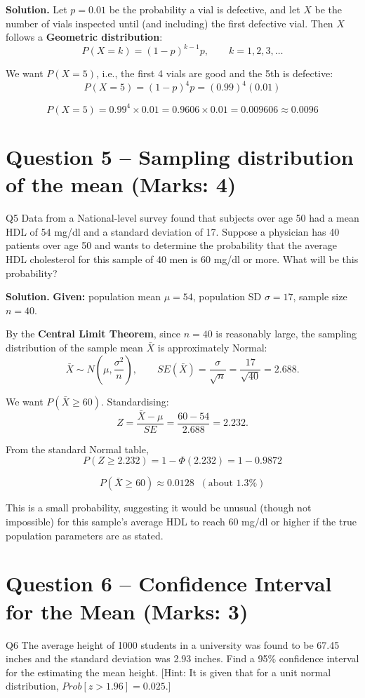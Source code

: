 \documentclass[11pt]{article}
\newcommand{\soln}{\par\noindent\textcolor{acolor}{\textbf{Solution.}}\quad}
\begin{document}
\soln
Let $p = 0.01$ be the probability a vial is defective, and let $X$ be the number of vials inspected until (and including) the first defective vial. Then $X$ follows a \textbf{Geometric distribution}:
\[
P(X=k) = (1-p)^{k-1}p, \qquad k=1,2,3,\dots
\]

We want $P(X=5)$, i.e., the first 4 vials are good and the 5th is defective:
\[
P(X=5) = (1-p)^4 p = (0.99)^4(0.01)
\]

\[
\boxed{P(X=5) = 0.99^4 \times 0.01 = 0.9606 \times 0.01 = 0.009606 \approx 0.0096}
\]

\section{Question 5 -- Sampling distribution of the mean (Marks: 4)}
\begin{question}{Q5}
Data from a National-level survey found that subjects over age 50 had a mean HDL of 54 mg/dl and a standard deviation of 17. Suppose a physician has 40 patients over age 50 and wants to determine the probability that the average HDL cholesterol for this sample of 40 men is 60 mg/dl or more. What will be this probability?
\end{question}

\soln
\textbf{Given:} population mean $\mu = 54$, population SD $\sigma = 17$, sample size $n=40$.

By the \textbf{Central Limit Theorem}, since $n=40$ is reasonably large, the sampling distribution of the sample mean $\bar{X}$ is approximately Normal:
\[
\bar{X} \sim N\left(\mu, \frac{\sigma^2}{n}\right), \qquad
SE(\bar{X}) = \frac{\sigma}{\sqrt{n}} = \frac{17}{\sqrt{40}} = 2.688.
\]

We want $P(\bar{X} \ge 60)$. Standardising:
\[
Z = \frac{\bar{X} - \mu}{SE} = \frac{60-54}{2.688} = 2.232.
\]

From the standard Normal table,
\[
P(Z \ge 2.232) = 1 - \Phi(2.232) = 1 - 0.9872
\]

\[
\boxed{P(\bar{X} \ge 60) \approx 0.0128 \;\; (\text{about } 1.3\%)}
\]

This is a small probability, suggesting it would be unusual (though not impossible) for this sample's average HDL to reach 60 mg/dl or higher if the true population parameters are as stated.

\section{Question 6 -- Confidence Interval for the Mean (Marks: 3)}
\begin{question}{Q6}
The average height of 1000 students in a university was found to be 67.45 inches and the standard deviation was 2.93 inches. Find a 95\% confidence interval for the estimating the mean height. [Hint: It is given that for a unit normal distribution, $Prob[z>1.96]=0.025$.]
\end{question}
\end{document}

